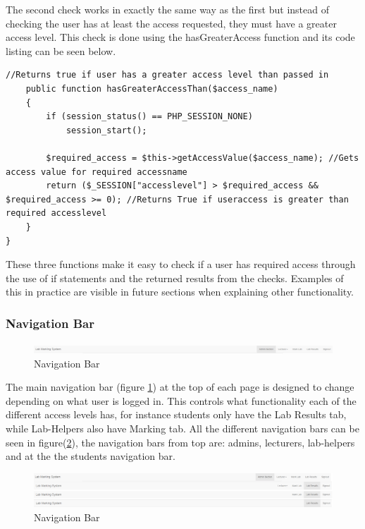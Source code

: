 \documentclass[12pt]{article}  %
\begin{document}
\noindent The second check works in exactly the same way as the first but instead of checking the user has at least the access requested, they must have a greater access level. This check is done using the hasGreaterAccess function and its code listing can be seen below.

\singlespacing
\begin{lstlisting}[caption= Has Great Access Than - PHP, label = lst:security-greater]
    //Returns true if user has a greater access level than passed in
    public function hasGreaterAccessThan($access_name)
    {
        if (session_status() == PHP_SESSION_NONE)
            session_start();

        $required_access = $this->getAccessValue($access_name); //Gets access value for required accessname
        return ($_SESSION["accesslevel"] > $required_access && $required_access >= 0); //Returns True if useraccess is greater than required accesslevel
    }
}
\end{lstlisting}
\doublespacing


\noindent These three functions make it easy to check if a user has required access through the use of if statements and the returned results from the checks. Examples of this in practice are visible in future sections when explaining other functionality. 


\subsubsection{Navigation Bar}

\begin{figure}[H]
    \centering
    \includegraphics[width=1\textwidth]{images/implementation/nav-bar.png}
    \caption{Navigation Bar}
    \label{fig:nav-bar}
\end{figure}

The main navigation bar (figure \ref{fig:nav-bar}) at the top of each page is designed to change depending on what user is logged in. This controls what functionality each of the different access levels has, for instance students only have the Lab Results tab, while Lab-Helpers also have Marking tab. All the different navigation bars can be seen in figure(\ref{fig:nav-all}), the navigation bars from top are: admins, lecturers, lab-helpers and at the the students navigation bar.  

\begin{figure}[H]
    \centering
    \includegraphics[width=1\textwidth]{images/implementation/nav-all.png}
    \caption{Navigation Bar}
    \label{fig:nav-all}
\end{figure}
\end{document}
